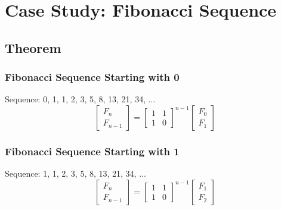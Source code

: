 \section{Case Study: Fibonacci Sequence}

\subsection*{Theorem}

\subsubsection*{Fibonacci Sequence Starting with 0}
Sequence: 0, 1, 1, 2, 3, 5, 8, 13, 21, 34, ...
\[
\begin{bmatrix}
F_{n}\\
F_{n-1}
\end{bmatrix}
=
\begin{bmatrix}
1 & 1\\
1 & 0
\end{bmatrix}^{n-1}
\begin{bmatrix}
F_{0}\\
F_{1}
\end{bmatrix}
\]

\subsubsection*{Fibonacci Sequence Starting with 1}
Sequence: 1, 1, 2, 3, 5, 8, 13, 21, 34, ...
\[
\begin{bmatrix}
F_{n}\\
F_{n-1}
\end{bmatrix}
=
\begin{bmatrix}
1 & 1\\
1 & 0
\end{bmatrix}^{n-1}
\begin{bmatrix}
F_{1}\\
F_{2}
\end{bmatrix}
\]

